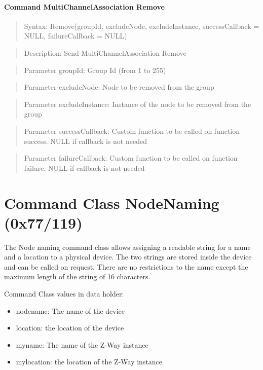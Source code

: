 \paragraph {Command MultiChannelAssociation Remove}
\begin{quote} Syntax: Remove(groupId, excludeNode, excludeInstance, successCallback = NULL, failureCallback = NULL)\end{quote}
\begin{quote} Description: Send MultiChannelAssociation Remove\end{quote}
\begin{quote} Parameter groupId: Group Id (from 1 to 255)\end{quote}
\begin{quote} Parameter excludeNode: Node to be removed from the group\end{quote}
\begin{quote} Parameter excludeInstance: Instance of the node to be removed from the group\end{quote}
\begin{quote} Parameter successCallback: Custom function to be called on function success. NULL if callback is not needed\end{quote}
\begin{quote} Parameter failureCallback: Custom function to be called on function failure. NULL if callback is not needed\end{quote}

\section{Command Class NodeNaming (0x77/119)}

The Node naming command class allows assigning a readable string for a name and a location to a physical device. The two strings 
are stored inside the device and can be called on request. There are no restrictions to the name except the maximum length of the 
string of  16 characters.

Command Class values in data holder:
\begin{itemize}
\item nodename: The name of the device
\item location:  the location of the device
\item myname: The name of the Z-Way instance
\item mylocation:  the location of the Z-Way instance
\end{itemize}


